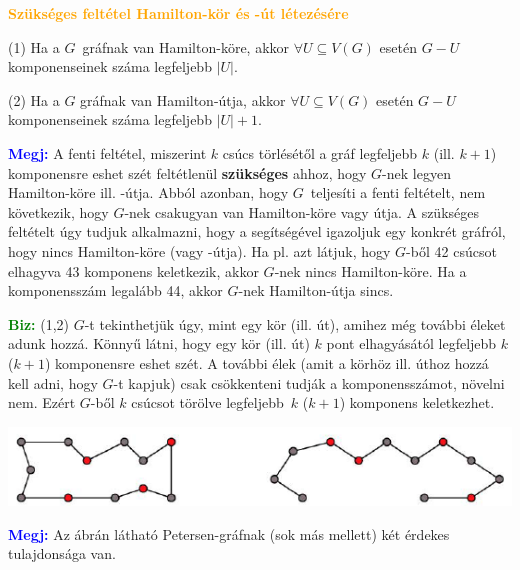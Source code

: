 \documentclass[../../szobeli.tex]{subfiles}
\begin{document}
\begin{itemize}
            \textcolor{orange}{\textbf{Szükséges feltétel Hamilton-kör és -út létezésére}}

            (1) Ha a $G$ gráfnak van Hamilton-köre, akkor $\forall U \subseteq V(G)$ esetén $G-U$ komponenseinek száma legfeljebb $|U|$.

            (2) Ha a $G$ gráfnak van Hamilton-útja, akkor $\forall U \subseteq V(G)$ esetén $G-U$ komponenseinek száma legfeljebb $|U|+1$. 

            \textcolor{blue}{\textbf{Megj:}} A fenti feltétel, miszerint $k$ csúcs törlésétől a gráf legfeljebb $k$ (ill. $k+1$) komponensre eshet szét feltétlenül \textbf{szükséges} ahhoz, hogy $G$-nek legyen Hamilton-köre ill. -útja. Abból azonban, hogy $G$ teljesíti a fenti feltételt, nem következik, hogy $G$-nek csakugyan van Hamilton-köre vagy útja. A szükséges feltételt úgy tudjuk alkalmazni, hogy a segítségével igazoljuk egy konkrét gráfról, hogy nincs Hamilton-köre (vagy -útja). Ha pl. azt látjuk, hogy $G$-ből 42 csúcsot elhagyva 43 komponens keletkezik, akkor $G$-nek nincs Hamilton-köre. Ha a komponensszám legalább 44, akkor $G$-nek Hamilton-útja sincs.
            
            \textcolor{green}{\textbf{Biz:}} (1,2) $G$-t tekinthetjük úgy, mint egy kör (ill. út), amihez még további éleket adunk hozzá. Könnyű látni, hogy egy kör (ill. út) $k$ pont elhagyásától legfeljebb $k$ ($k+1$) komponensre eshet szét. A további élek (amit a körhöz ill. úthoz hozzá kell adni, hogy $G$-t kapjuk) csak csökkenteni tudják a komponensszámot, növelni nem. Ezért $G$-ből $k$ csúcsot törölve legfeljebb $k$ ($k+1$) komponens keletkezhet. 

            \includegraphics[width=\textwidth]{./img/4.png}

            \textcolor{blue}{\textbf{Megj:}} Az ábrán látható Petersen-gráfnak (sok más mellett) két érdekes tulajdonsága van. 


\end{itemize}
\end{document}
